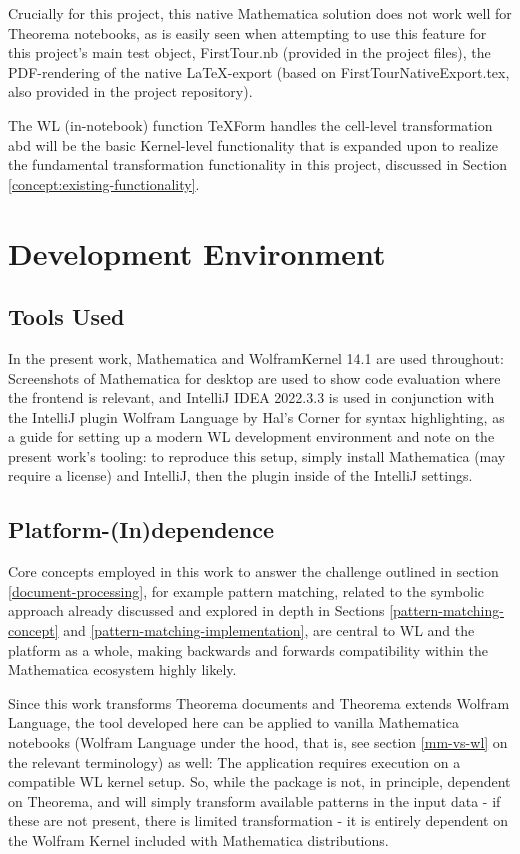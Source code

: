 Crucially for this project, this native Mathematica solution does not work well for Theorema notebooks, as is easily seen when attempting to use this feature for this project's main test object, FirstTour.nb (provided in the project files), the PDF-rendering of the native \LaTeX-export (based on FirstTourNativeExport.tex, also provided in the project repository).

The WL (in-notebook) function TeXForm handles the cell-level transformation abd will be the basic Kernel-level functionality that is expanded upon to realize the fundamental transformation functionality in this project, discussed in Section \ref{concept:existing-functionality}.

\section{Development Environment}

\subsection{Tools Used}

In the present work, Mathematica and WolframKernel 14.1 \cite{noauthor_wolfram_nodate} are used throughout: Screenshots of Mathematica for desktop are used to show code evaluation where the frontend is relevant, and IntelliJ IDEA 2022.3.3 \cite{noauthor_intellij_nodate} is used in conjunction with the IntelliJ plugin Wolfram Language by Hal's Corner \cite{noauthor_wolfram_nodate-1} for syntax highlighting, as a guide for setting up a modern WL development environment and note on the present work's tooling: to reproduce this setup, simply install Mathematica (may require a license) and IntelliJ, then the plugin inside of the IntelliJ settings.


\subsection{Platform-(In)dependence}

Core concepts employed in this work to answer the challenge outlined in section \ref{document-processing}, for example pattern matching, related to the symbolic approach already discussed and explored in depth in Sections \ref{pattern-matching-concept} and \ref{pattern-matching-implementation}, are central to WL and the platform as a whole, making backwards and forwards compatibility within the Mathematica ecosystem highly likely. 

Since this work transforms Theorema documents and Theorema extends Wolfram Language, the tool developed here can be applied to vanilla Mathematica notebooks (Wolfram Language under the hood, that is, see section \ref{mm-vs-wl} on the relevant terminology) as well: The application requires execution on a compatible WL kernel setup. So, while the package is not, in principle, dependent on Theorema, and will simply transform available patterns in the input data - if these are not present, there is limited transformation - it is entirely dependent on the Wolfram Kernel included with Mathematica distributions.

